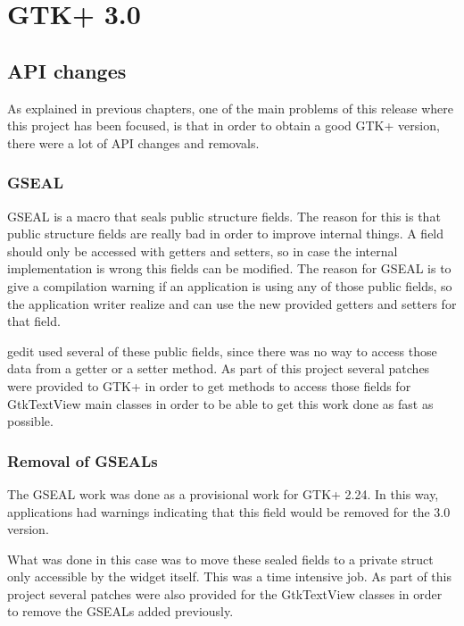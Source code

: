 

\chapter{GTK+ 3.0}\label{chap:GTK3}


\section{API changes}

As explained in previous chapters, one of the main problems of this release where 
this project has been focused, is that in order to obtain a good GTK+ version, 
there were a lot of API changes and removals.

\subsection{GSEAL}

GSEAL is a macro that seals public structure fields. The reason for this is that 
public structure fields are really bad in order to improve internal things. A field 
should only be accessed with getters and setters, so in case the internal implementation 
is wrong this fields can be modified. The reason for GSEAL is to give a compilation 
warning if an application is using any of those public fields, so the application 
writer realize and can use the new provided getters and setters for that field.

gedit used several of these public fields, since there was no way to access those 
data from a getter or a setter method. As part of this project several patches 
were provided to GTK+ in order to get methods to access those fields for GtkTextView 
main classes in order to be able to get this work done as fast as possible.

\subsection{Removal of GSEALs}

The GSEAL work was done as a provisional work for GTK+ 2.24.  In this way, applications 
had warnings indicating that this field would be removed for the 3.0 version.

What was done in this case was to move these sealed fields to a private struct 
only accessible by the widget itself. This was a time intensive job. As part of 
this project several patches were also provided for the GtkTextView classes in order 
to remove the GSEALs added previously.

